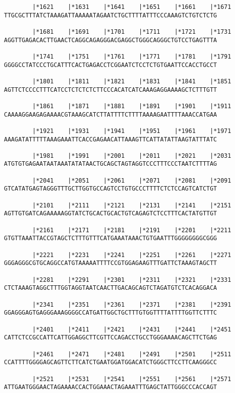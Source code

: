 \documentclass{article}
\begin{document}
\begin{Verbatim}
        |*1621    |*1631    |*1641    |*1651    |*1661    |*1671
TTGCGCTTTATCTAAAGATTAAAAATAGAATCTGCTTTTATTTCCCAAAGTCTGTCTCTG
  
        |*1681    |*1691    |*1701    |*1711    |*1721    |*1731
AGGTTGAGACACTTGAACTCAGGCAGAGGGACGAGGCTGGGCAGGGCTGTCCTGAGTTTA
  
        |*1741    |*1751    |*1761    |*1771    |*1781    |*1791
GGGGCCTATCCCTGCATTTCACTGAGACCTCGGAATCTCCTCTGTGAATTCCACCTGCCT
  
        |*1801    |*1811    |*1821    |*1831    |*1841    |*1851
AGTTCTCCCCTTTCATCCTCTCTCTCTTCCCACATCATCAAAGAGGAAAAGCTCTTTGTT
  
        |*1861    |*1871    |*1881    |*1891    |*1901    |*1911
CAAAAGGAAGAGAAAACGTAAAGCATCTTATTTTCTTTTAAAAGAATTTTAAACCATGAA
  
        |*1921    |*1931    |*1941    |*1951    |*1961    |*1971
AAAGATATTTTTAAAGAAATTCACCGAGAACATTAAAGTTCATTATATTAAGTATTTATC
  
        |*1981    |*1991    |*2001    |*2011    |*2021    |*2031
ATGTGTGAGAATAATAAATATATAACTGCAGCTAGTAGGTCCCTTTCCCTAATCTTTTAG
  
        |*2041    |*2051    |*2061    |*2071    |*2081    |*2091
GTCATATGAGTAGGGTTTGCTTGGTGCCAGTCCTGTGCCCTTTTCTCTCCAGTCATCTGT
  
        |*2101    |*2111    |*2121    |*2131    |*2141    |*2151
AGTTGTGATCAGAAAAAGGTATCTGCACTGCACTGTCAGAGTCTCCTTTCACTATGTTGT
  
        |*2161    |*2171    |*2181    |*2191    |*2201    |*2211
GTGTTAAATTACCGTAGCTCTTTGTTTCATGAAATAAACTGTGAATTTGGGGGGGGCGGG
  
        |*2221    |*2231    |*2241    |*2251    |*2261    |*2271
GGGAGGGCGTGCAGGCCATGTAAAAATTTTCCGTGGAGAAGTTTGATTCTAAAGTAGCTT
  
        |*2281    |*2291    |*2301    |*2311    |*2321    |*2331
CTCTAAAGTAGGCTTTGGTAGGTAATCAACTTGACAGCAGTCTAGATGTCTCACAGGACA
  
        |*2341    |*2351    |*2361    |*2371    |*2381    |*2391
GGAGGGAGTGAGGGAAAGGGGCCATGATTGGCTGCTTTGTGGTTTTATTTTGGTTCTTTC
  
        |*2401    |*2411    |*2421    |*2431    |*2441    |*2451
CATTCTCCGCCATTCATTGGAGGCTTCGTTCCAGACCTGCCTGGGAAAACAGCTTCTGAG
  
        |*2461    |*2471    |*2481    |*2491    |*2501    |*2511
CCATTTTGGGGAGCAGTTCTTCATCTGAATGGATGGACATCTGGGCTTCCTTCAAGGGCC
  
        |*2521    |*2531    |*2541    |*2551    |*2561    |*2571
ATTGAATGGGAACTAGAAAACCACTGGAAACTAGAAATTTGAGCTATTGGGCCCACCAGT
  

\end{Verbatim}
\end{document}
